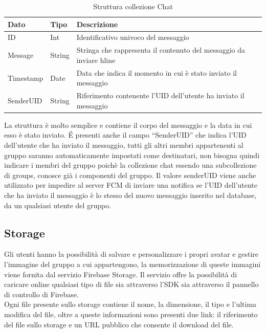 \begin{table}[h]
\begin{center}
\begin{tabular}{|l|l|p{10cm}|}
    \hline
\textbf{Dato} & \textbf{Tipo}  & \textbf{Descrizione}\\ \hline
ID & Int & Identificativo univoco del messaggio\\ \hline
Message & String & Stringa che rappresenta il contenuto del messaggio da inviare hline\\ \hline
Timestamp & Date & Data che indica il momento in cui è stato inviato il messaggio\\ \hline
SenderUID & String & Riferimento contenente l'UID dell'utente ha inviato il messaggio \\
\hline
\end{tabular}
\caption[Collezione Chat]{Struttura collezione Chat}\label{tab:Strutture collezione Chat}
\end{center}
\end{table}
La struttura è molto semplice e contiene il corpo del messaggio e la data in cui esso è stato inviato. \'E presenti anche il campo ``SenderUID'' che indica l'UID dell'utente che ha inviato il messaggio, tutti gli altri membri appartenenti al gruppo saranno automaticamente impostati come destinatari, non bisogna quindi indicare i membri del gruppo poichè la collezione chat essendo una subcollezione di groups, conosce già i componenti del gruppo.
Il valore senderUID viene anche utilizzato per impedire al server FCM di inviare una notifica se l'UID dell'utente che ha inviato il messaggio è lo stesso del nuovo messaggio inserito nel database, da un qualsiasi utente del gruppo.\\



\newpage

\subsection{Storage}
Gli utenti hanno la possibilità di salvare e personalizzare i propri avatar e gestire l'immagine del gruppo a cui appartengono, la memorizzazione di queste immagini viene fornita dal servizio Firebase Storage.
Il servizio offre la possibilità di caricare online qualsiasi tipo di file sia attraverso l'SDK sia attraverso il pannello di controllo di Firebase.\\
Ogni file presente sullo storage contiene il nome, la dimensione, il tipo e l'ultima modifica del file, oltre a queste informazioni sono presenti due link: il riferimento del file sullo storage e un URL pubblico che consente il download del file.

